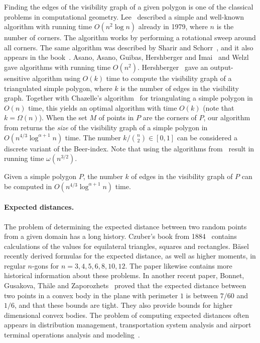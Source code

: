 \documentclass{article}
\begin{document}
Finding the edges of the visibility graph of a given polygon is one of the classical problems in computational geometry.
Lee~\cite{lee1978proximity} described a simple and well-known algorithm with running time $O(n^2\log n)$ already in 1979, where $n$ is the number of corners.
The algorithm works by performing a rotational sweep around all corners.
The same algorithm was described by Sharir and Schorr~\cite{DBLP:journals/siamcomp/SharirS86}, and it also appears in the book~\cite{DBLP:books/lib/BergCKO08}.
Asano, Asano, Guibas, Hershberger and Imai~\cite{DBLP:journals/algorithmica/AsanoAGHI86} and Welzl~\cite{DBLP:journals/ipl/Welzl85} gave algorithms with running time $O(n^2)$.
Hershberger~\cite{DBLP:journals/algorithmica/Hershberger89} gave an output-sensitive algorithm using $O(k)$ time to compute the visibility graph of a triangulated simple polygon, where $k$ is the number of edges in the visibility graph.
Together with Chazelle's algorithm~\cite{DBLP:journals/dcg/Chazelle91} for triangulating a simple polygon in $O(n)$ time, this yields an optimal algorithm with time $O(k)$ (note that $k=\Omega(n)$).
When the set $M$ of points in $P$ are the corners of $P$, our algorithm from  returns the \emph{size} of the visibility graph of a simple polygon in $O(n^{4/3}\log^{\alpha+1} n)$ time.
The number $k/\binom{n}{2}\in [0,1]$ can be considered a discrete variant of the Beer-index.
Note that using the algorithms from~\cite{buchin2022segment} result in running time $\omega(n^{3/2})$.

\begin{corollary}
Given a simple polygon $P$, the number $k$ of edges in the visibility graph of $P$ can be computed in $O(n^{4/3}\log^{\alpha+1} n)$ time.
\end{corollary}


\paragraph{Expected distances.}
The problem of determining the expected distance between two random points from a given domain has a long history.
Czuber's book from 1884~\cite{czuber1884geometrische} contains calculations of the values for equilateral triangles, squares and rectangles.
Bäsel~\cite{basel2021moments} recently derived formulas for the expected distance, as well as higher moments, in regular $n$-gons for $n=3, 4, 5, 6, 8, 10, 12$.
The paper likewise contains more historical information about these problems.
In another recent paper, Bonnet, Gusakova, Thäle and Zaporozhets~\cite{BONNET2021107813} proved that the expected distance between two points in a convex body in the plane with perimeter $1$ is between $7/60$ and $1/6$, and that these bounds are tight.
They also provide bounds for higher dimensional convex bodies.
The problem of computing expected distances often appears in distribution management, transportation system analysis and airport terminal operations analysis and modeling~\cite{hsu1990expected,BANDARA199259,TOSIC19923}.
\end{document}
